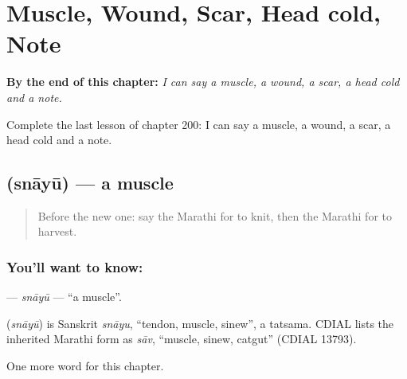 
\chapter{Muscle, Wound, Scar, Head cold, Note}
\label{ch:mr-muscle-wound-scar-head-cold-note}

\begin{chapteropening}
\textbf{By the end of this chapter:} \emph{I can say a muscle, a wound, a scar, a head cold and a note.}

Complete the last lesson of chapter 200: I can say a muscle, a wound, a scar, a head cold and a note.
\end{chapteropening}

\section[\texorpdfstring{\mr{स्नायू} (snāyū)}{स्नायू (snāyū)}]{ (snāyū) — a muscle}

\label{lesson:MR-C200-snayu}



\begin{quote}
Before the new one: say the Marathi for to knit, then the Marathi for to harvest.
\end{quote}

\subsection*{You'll want to know: }
\textbf{} — \emph{snāyū} — \textquotedblleft{}a muscle\textquotedblright{}.

\begin{cousinweb}
\textbf{} (\emph{snāyū}) is Sanskrit \emph{snāyu}, \textquotedblleft{}tendon, muscle, sinew\textquotedblright{}, a tatsama. CDIAL lists the inherited Marathi form as \emph{sāv}, \textquotedblleft{}muscle, sinew, catgut\textquotedblright{} (CDIAL 13793).
\end{cousinweb}

\begin{grammarlens}[title={What you've built}]
One more word for this chapter.
\end{grammarlens}

